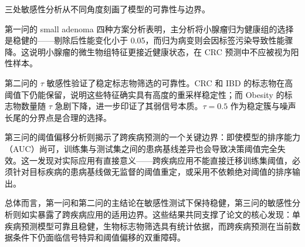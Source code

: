 三处敏感性分析从不同角度刻画了模型的可靠性与边界。

第一问的 small adenoma 四种方案分析表明，主分析将小腺瘤归为健康组的选择是稳健的——剔除后性能变化小于 0.05，而归为病变则会因标签污染导致性能骤降。这说明小腺瘤的微生物组特征更接近健康状态，在 CRC 预测中不应被视为阳性样本。

第二问的 $\tau$ 敏感性验证了稳定标志物筛选的可靠性。CRC 和 IBD 的标志物在高阈值下仍能保留，说明这些特征确实具有高度的重采样稳定性；而 Obesity 的标志物数量随 $\tau$ 急剧下降，进一步印证了其弱信号本质。$\tau=0.5$ 作为稳定簇与噪声长尾的分界点是合理的选择。

第三问的阈值偏移分析则揭示了跨疾病预测的一个关键边界：即使模型的排序能力（AUC）尚可，训练集与测试集之间的患病基线差异也会导致决策阈值完全失效。这一发现对实际应用有直接意义——跨疾病应用不能直接迁移训练集阈值，必须针对目标疾病的患病基线做无监督的阈值重定，或采用不依赖绝对阈值的排序输出。

总体而言，第一问和第二问的主结论在敏感性测试下保持稳健，第三问的敏感性分析则如实暴露了跨疾病应用的适用边界。这些结果共同支撑了论文的核心发现：单疾病预测模型可靠且稳健，生物标志物筛选具有统计依据，而跨疾病预测在当前数据条件下仍面临信号特异和阈值偏移的双重障碍。
